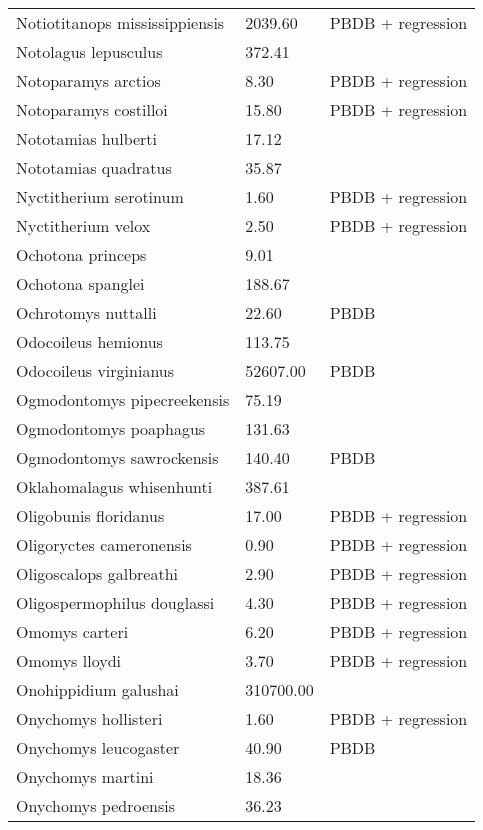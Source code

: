 \begin{longtable}{p{} p{} p{}}
    Notiotitanops mississippiensis & 2039.60 & PBDB + regression \\ 
    Notolagus lepusculus & 372.41 & \cite{Tomiya2013} \\ 
    Notoparamys arctios & 8.30 & PBDB + regression \\ 
    Notoparamys costilloi & 15.80 & PBDB + regression \\ 
    Nototamias hulberti & 17.12 & \cite{Tomiya2013} \\ 
    Nototamias quadratus & 35.87 & \cite{Tomiya2013} \\ 
    Nyctitherium serotinum & 1.60 & PBDB + regression \\ 
    Nyctitherium velox & 2.50 & PBDB + regression \\ 
    Ochotona princeps & 9.01 & \cite{Smith2004} \\ 
    Ochotona spanglei & 188.67 & \cite{Tomiya2013} \\ 
    Ochrotomys nuttalli & 22.60 & PBDB \\ 
    Odocoileus hemionus & 113.75 & \cite{Smith2004} \\ 
    Odocoileus virginianus & 52607.00 & PBDB \\ 
    Ogmodontomys pipecreekensis & 75.19 & \cite{Tomiya2013} \\ 
    Ogmodontomys poaphagus & 131.63 & \cite{Tomiya2013} \\ 
    Ogmodontomys sawrockensis & 140.40 & PBDB \\ 
    Oklahomalagus whisenhunti & 387.61 & \cite{Tomiya2013} \\ 
    Oligobunis floridanus & 17.00 & PBDB + regression \\ 
    Oligoryctes cameronensis & 0.90 & PBDB + regression \\ 
    Oligoscalops galbreathi & 2.90 & PBDB + regression \\ 
    Oligospermophilus douglassi & 4.30 & PBDB + regression \\ 
    Omomys carteri & 6.20 & PBDB + regression \\ 
    Omomys lloydi & 3.70 & PBDB + regression \\ 
    Onohippidium galushai & 310700.00 & \cite{MacFadden1986} \\ 
    Onychomys hollisteri & 1.60 & PBDB + regression \\ 
    Onychomys leucogaster & 40.90 & PBDB \\ 
    Onychomys martini & 18.36 & \cite{Tomiya2013} \\ 
    Onychomys pedroensis & 36.23 & \cite{Tomiya2013} \\ 

\end{longtable}
